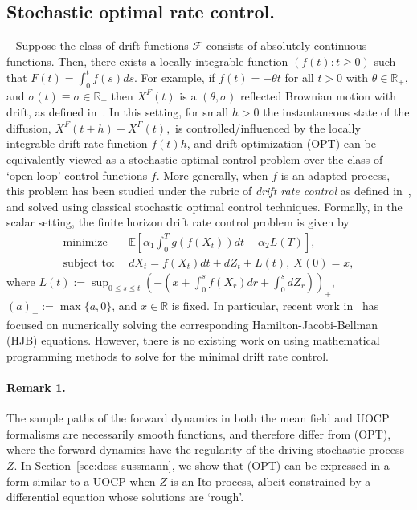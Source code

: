 \documentclass[11pt,leqno]{amsart}
\begin{document}
\subsection{Stochastic optimal rate control.}~\label{sec:drc} Suppose the class of drift functions $\mathcal F$ consists of absolutely continuous functions. Then, there exists a locally integrable function $(f(t): t \geq 0)$ such that $F(t) = \int_0^t f(s) ds$. For example, if $f(t) = -\theta t$ for all $t > 0$ with $\theta \in \mathbb R_+$, and $\sigma(t) \equiv \sigma \in \mathbb R_+$ then $X^F(t)$ is a $(\theta,\sigma)$ reflected Brownian motion with drift, as defined in~\cite{Harrison_2013}. In this setting, for small $h > 0$ the instantaneous state of the diffusion, $X^F(t+h) - X^F(t),$  is controlled/influenced by the locally integrable drift rate function $f(t) h$, and drift optimization (OPT) can be equivalently viewed as a stochastic optimal control problem over the class of `open loop' control functions $f$. More generally, when $f$ is an adapted process, this problem has been studied under the rubric of {\it drift rate control} as defined in~\cite{Ata_2005,ata2024drift}, and solved using classical stochastic optimal control techniques. Formally, in the scalar setting, the finite horizon drift rate control problem is given by
\begin{align*}
    \text{minimize}~&~\mathbb E\left [ \alpha_1 \int_0^T g(f(X_t)) dt + \alpha_2 L(T) \right],\\
    \text{subject to:}~&~ dX_t = f(X_t) dt + dZ_t + L(t),~X(0) = x,
\end{align*}
where $L(t) := \sup_{0 \leq s \leq t} (-(x + \int_0^s f(X_r) dr + \int_0^s dZ_r))_+$, $(a)_+ := \max\{a,0\}$, and $x \in \mathbb R$ is fixed. In particular, recent work in~\cite{ata2024drift,ata2024singular} has focused on numerically solving the corresponding Hamilton-Jacobi-Bellman (HJB) equations. However, there is no existing work on using mathematical programming methods to solve for the minimal drift rate control. 

\paragraph{Remark 1.} The sample paths of the forward dynamics in both the mean field and UOCP formalisms are necessarily smooth functions, and therefore differ from (OPT), where the forward dynamics have the regularity of the driving stochastic process $Z$. In Section~\ref{sec:doss-sussmann}, we show that (OPT) can be expressed in a form similar to a UOCP when $Z$ is an Ito process, albeit constrained by a differential equation whose solutions are `rough'. 
\end{document}
